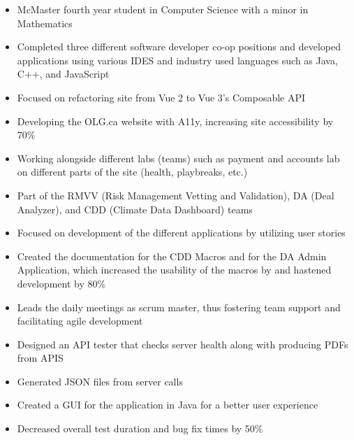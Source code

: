 \documentclass[10pt,a4paper,ragged2e,withhyper,darkmode]{altacv}
\begin{document}

\makecvheader
\begin{paracol}{1}
  \begin{itemize}
    \item {McMaster fourth year student in Computer Science with a minor in Mathematics}
    \item {Completed three different software developer co-op positions and developed applications using various IDES and industry used languages such as Java, C++, and JavaScript}
  \end{itemize}
  \begin{itemize}
    \item{Focused on refactoring site from Vue 2 to Vue 3's Composable API}
    \item{Developing the OLG.ca website with A11y, increasing site accessibility by 70\%}
    \item{Working alongside different labs (teams) such as payment and accounts lab on different parts of the site (health, playbreaks, etc.)}
  \end{itemize}
  \begin{itemize}
    \item{Part of the RMVV (Risk Management Vetting and Validation), DA (Deal Analyzer), and CDD (Climate Data Dashboard) teams}
    \item{Focused on development of the different applications by utilizing user stories}
    \item{Created the documentation for the CDD Macros and for the DA Admin Application, which increased the usability of the macros by and hastened development by 80\%}
    \item{Leads the daily meetings as scrum master, thus fostering team support and facilitating agile development}
  \end{itemize}
  \begin{itemize}
    \item Designed an API tester that checks server health along with producing PDFs from APIS
    \item Generated JSON files from server calls
    \item Created a GUI for the application in Java for a better user experience
    \item Decreased overall test duration and bug fix times by 50\%
  \end{itemize}


\end{paracol}
\end{document}
